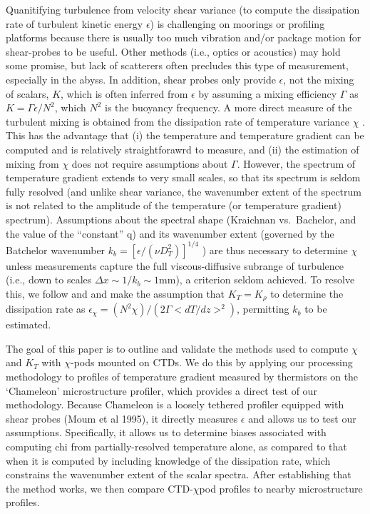 \documentclass{ametsoc}
\begin{document}
Quanitifying turbulence from velocity shear variance (to compute the dissipation rate of turbulent kinetic energy $\epsilon$) is challenging on moorings or profiling platforms because there is usually too much vibration and/or package motion for shear-probes to be useful. Other methods (i.e., optics or acoustics) may hold some promise, but lack of scatterers often precludes this type of measurement, especially in the abyss.  In addition, shear probes only provide $\epsilon$, not the mixing of scalars, $K$, which is often inferred from $\epsilon$ by assuming a mixing efficiency $\Gamma$ \citep{osborn80} as $K=\Gamma \epsilon / N^{2}$, which $N^2$ is the buoyancy frequency.  A more direct measure of the turbulent mixing is obtained from the dissipation rate of temperature variance $\chi$ \citep{osborncox72}.  This has the advantage that (i) the temperature and temperature gradient can be computed and is relatively straightforawrd to measure, and (ii) the estimation of mixing from $\chi$ does not require assumptions about $\Gamma$. However, the spectrum of temperature gradient extends to very small scales, so that its spectrum is seldom fully resolved (and unlike shear variance, the wavenumber extent of the spectrum is not related to the amplitude of the temperature (or temperature gradient) spectrum). Assumptions about the spectral shape (Kraichnan vs.\ Bachelor, and the value of the ``constant'' q) and its wavenumber extent (governed by the Batchelor wavenumber $k_b=[\epsilon/(\nu D_{T}^{2})]^{1/4}$  \citep{Batchelor59}) are thus necessary to determine $\chi$ unless measurements capture the full viscous-diffusive subrange of turbulence (i.e., down to scales $\Delta x \sim 1/k_b \sim 1$mm), a criterion seldom achieved.  To resolve this, we follow \cite{alfordpinkel00b} and \cite{moumnash09} and make the assumption that $K_T=K_{\rho}$ to determine the dissipation rate as $\epsilon_{\chi}=(N^2\chi)/(2\Gamma <dT/dz>^2)$, permitting $k_b$ to be estimated. 


The goal of this paper is to outline and validate the methods used to compute $\chi$ and $K_T$ with $\chi$-pods mounted on CTDs.  We do this by applying our processing methodology to profiles of temperature gradient measured by thermistors on the `Chameleon' microstructure profiler, which provides a direct test of our methodology.  Because Chameleon is a loosely tethered profiler equipped with shear probes (Moum et al 1995), it directly measures $\epsilon$ and allows us to test our assumptions.  Specifically, it allows us to determine biases associated with computing chi from partially-resolved temperature alone, as compared to that when it is computed by including knowledge of the dissipation rate, which constrains the wavenumber extent of the scalar spectra.   After establishing that the method works, we then compare CTD-$\chi$pod profiles to nearby microstructure profiles.
\end{document}
